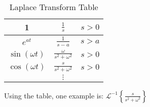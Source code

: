 \documentclass[../main/main.tex]{subfiles}
\begin{document}
\begin{table}[htpb]
	\centering
	\caption{Laplace Transform Table}
	\begin{tabular}{c|c|c}
	 1& $\frac{1}{s}$ & $s>0$\\
	 \hline
	 $e^{at}$& $\frac{1}{s-a}$ & $s>a$\\
	 \hline
	 $\sin(\omega t)$& $\frac{\omega}{s^2+\omega^2}$ & $s>0$\\
	 \hline
	 $\cos(\omega t)$& $\frac{s}{s^2+\omega^2}$ & $s>0$\\
	 \hline
					 &$\vdots$&
	\end{tabular}
\end{table}
\begin{remark}
	Using the table, one example is: $\mathcal{L}^{-1}\left\{ \frac{s}{s^2+\omega^2}\right\}$
\end{remark}
\end{document}
